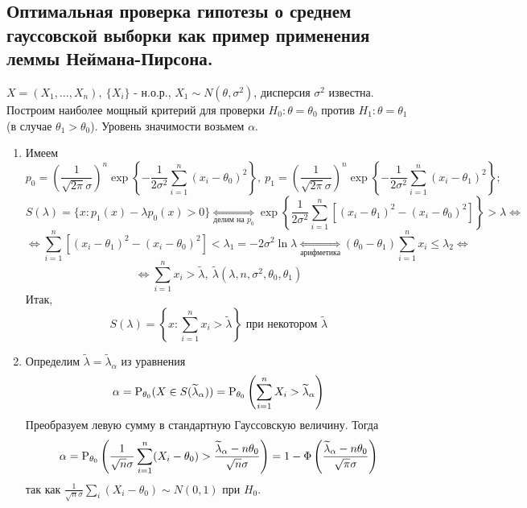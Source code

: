 \subsection{Оптимальная проверка гипотезы о среднем
гауссовской выборки как пример применения леммы Неймана-Пирсона.}
\begin{example}
    \(X = (X_1,\ldots, X_n),\ \{X_i\}\) - н.о.р., \(X_1 \sim N(\theta, \sigma^2)\),
    дисперсия \(\sigma^2\) известна. Построим наиболее мощный критерий
    для проверки \(H_0: \theta = \theta_0\) против \(H_1: \theta = \theta_1\)
    (в случае \(\theta_1 > \theta_0\)). Уровень значимости возьмем \(\alpha\).
    \begin{enumerate}
        \item Имеем
        \[p_0 = \left(\frac{1}{\sqrt{2\pi}\sigma}\right)^n \exp{\left\{-\frac{1}{2\sigma^2} \sum^n_{i=1} (x_i -\theta_0)^2\right\}},\
        p_1 = \left(\frac{1}{\sqrt{2\pi}\sigma}\right)^n \exp{\left\{-\frac{1}{2\sigma^2} \sum^n_{i=1} (x_i -\theta_1)^2\right\}};\]
        \[S(\lambda) = \{x:p_1(x) - \lambda p_0(x) > 0\} \underset{\text{делим на }p_0}{\Leftrightarrow}
        \exp{\left\{\frac{1}{2\sigma^2}\sum_{i=1}^n\left[ (x_i-\theta_1)^2 -(x_i-\theta_0)^2 \right]\right\}} > \lambda\Leftrightarrow\]
        \[\Leftrightarrow \sum_{i=1}^n\left[(x_i - \theta_1)^2 - (x_i - \theta_0)^2\right] < \lambda_1 = -2\sigma^2\ln\lambda
        \underset{\text{арифметика}}{\Leftrightarrow} (\theta_0 - \theta_1)\sum_{i=1}^n x_i \leq\lambda_2 \Leftrightarrow\]
        \[\Leftrightarrow \sum_{i=1}^n x_i > \widetilde{\lambda},\ \widetilde{\lambda}(\lambda, n, \sigma^2, \theta_0, \theta_1)\]
        Итак,
        \[S(\lambda) = \left\{x: \sum_{i=1}^n x_i > \widetilde{\lambda}\right\} \text{ при некотором } \widetilde{\lambda}\]

        \item Определим \(\widetilde{\lambda} = \widetilde{\lambda}_\alpha\)
            из уравнения
            \[\alpha = \P_{\theta_0}(X \in S(\widetilde{\lambda}_\alpha)) =
            \P_{\theta_0}\left(\sum_{i=1}^n X_i > \widetilde{\lambda}_\alpha\right)\]
            Преобразуем левую сумму в стандартную Гауссовскую величину. Тогда
            \[\alpha = \P_{\theta_0}\left(\frac{1}{\sqrt{n} \sigma} \sum_{i=1}^n(X_i - \theta_0) > \frac{\widetilde{\lambda}_\alpha - n\theta_0}{\sqrt{n}\sigma}\right)=
            1 - \Phi\left(\frac{\widetilde{\lambda}_\alpha - n\theta_0}{\sqrt{\pi}\sigma}\right)\]
            так как \(\frac{1}{\sqrt{n}\sigma}\sum_{i} (X_i - \theta_0) \sim N(0, 1)\) при \(H_0\).


\end{enumerate}
\end{example}
